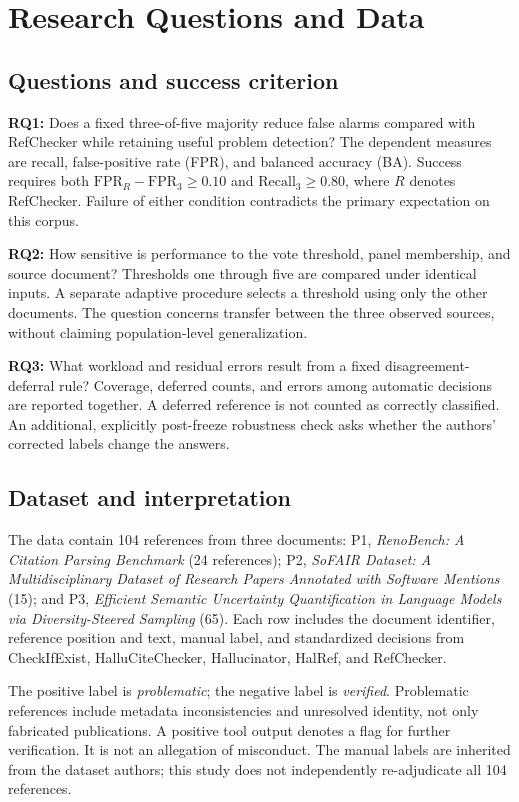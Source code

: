 \documentclass[acmsmall,screen,nonacm]{acmart}
\begin{document}
\section{Research Questions and Data}
\subsection{Questions and success criterion}
\textbf{RQ1:} Does a fixed three-of-five majority reduce false alarms compared with RefChecker while retaining useful problem detection? The dependent measures are recall, false-positive rate (FPR), and balanced accuracy (BA). Success requires both $\mathrm{FPR}_{R}-\mathrm{FPR}_{3}\geq0.10$ and $\mathrm{Recall}_{3}\geq0.80$, where $R$ denotes RefChecker. Failure of either condition contradicts the primary expectation on this corpus.

\textbf{RQ2:} How sensitive is performance to the vote threshold, panel membership, and source document? Thresholds one through five are compared under identical inputs. A separate adaptive procedure selects a threshold using only the other documents. The question concerns transfer between the three observed sources, without claiming population-level generalization.

\textbf{RQ3:} What workload and residual errors result from a fixed disagreement-deferral rule? Coverage, deferred counts, and errors among automatic decisions are reported together. A deferred reference is not counted as correctly classified. An additional, explicitly post-freeze robustness check asks whether the authors' corrected labels change the answers.

\subsection{Dataset and interpretation}
The data contain 104 references from three documents: P1, \emph{RenoBench: A Citation Parsing Benchmark} (24 references); P2, \emph{SoFAIR Dataset: A Multidisciplinary Dataset of Research Papers Annotated with Software Mentions} (15); and P3, \emph{Efficient Semantic Uncertainty Quantification in Language Models via Diversity-Steered Sampling} (65). Each row includes the document identifier, reference position and text, manual label, and standardized decisions from CheckIfExist, HalluCiteChecker, Hallucinator, HalRef, and RefChecker.

The positive label is \emph{problematic}; the negative label is \emph{verified}. Problematic references include metadata inconsistencies and unresolved identity, not only fabricated publications. A positive tool output denotes a flag for further verification. It is not an allegation of misconduct. The manual labels are inherited from the dataset authors; this study does not independently re-adjudicate all 104 references.
\end{document}
